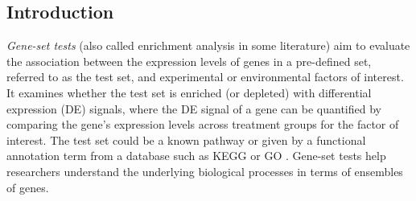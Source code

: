 	\subsection{Introduction}\label{section:introduction}
	
	\textit{Gene-set tests} (also called enrichment 
	analysis in some literature) aim to evaluate  the association between the expression levels of 
	genes in a pre-defined set, 
	referred to as the test set, and experimental or environmental factors of interest.
    It examines whether the test set is enriched (or depleted) with differential expression (DE) 
    signals, where the DE signal of a gene can be quantified by comparing the gene's expression 
    levels across treatment groups for the factor of interest. The test set could be a known 
    pathway or given by a 
    functional annotation term from a database such as KEGG\citep{kanehisa2000kegg} or GO 
    \citep{ashburner2000gene}.
	Gene-set tests help researchers understand the underlying biological processes in terms of 
	ensembles of genes.
	
